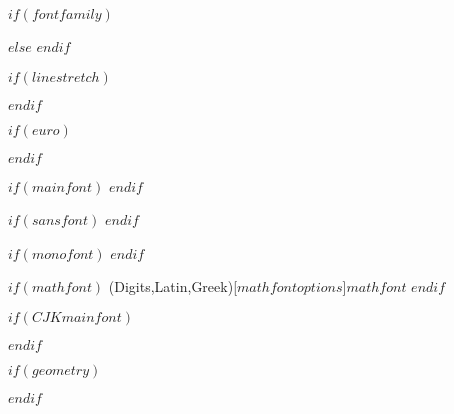 $if(fontfamily)$
    \usepackage[$fontfamilyoptions$]{$fontfamily$}
$else$
$endif$

$if(linestretch)$
    \usepackage{setspace}
$endif$

\usepackage{ifxetex,ifluatex}
\usepackage{fixltx2e} %
\usepackage{dingbat}
\usepackage{color}
\usepackage[usenames,dvipsnames,svgnames,table]{xcolor}
\usepackage[hyphens]{url}
\usepackage[babel, german=quotes]{csquotes}
\usepackage{index}
\usepackage[toc]{glossaries}
\usepackage{mathtools}
\usepackage{tocloft}
\usepackage{caption}
\usepackage{wrapfig}
\usepackage{chngcntr}
\usepackage{fancyhdr}
\usepackage{bibgerm}
\usepackage[printonlyused]{acronym}

\makeindex

\fi{} %
    \usepackage[$if(fontenc)$$fontenc$$else$T1$endif$]{fontenc}
    \usepackage[utf8]{inputenc}

    $if(euro)$
        \usepackage{eurosym}
    $endif$

\else %
    \ifxetex
        \usepackage{mathspec}
    \else
        \usepackage{fontspec}
    \fi

    \newcommand{\euro}{€}

    $if(mainfont)$
        \setmainfont[$mainfontoptions$]{$mainfont$}
    $endif$

    $if(sansfont)$
        \setsansfont[$sansfontoptions$]{$sansfont$}
    $endif$

    $if(monofont)$
        \setmonofont[Mapping=tex-ansi$if(monofontoptions)$,$monofontoptions$$endif$]{$monofont$}
    $endif$

    $if(mathfont)$
        \setmathfont(Digits,Latin,Greek)[$mathfontoptions$]{$mathfont$}
    $endif$

    $if(CJKmainfont)$
        \usepackage{xeCJK}
    $endif$
\fi



$if(geometry)$
    \usepackage[$for(geometry)$$geometry$$sep$,$endfor$]{geometry}
$endif$

